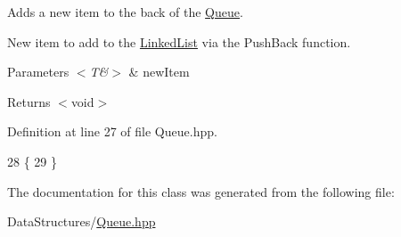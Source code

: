 Adds a new item to the back of the \hyperlink{classQueue}{Queue}. 

New item to add to the \hyperlink{classLinkedList}{Linked\+List} via the Push\+Back function.


\begin{DoxyParams}{Parameters}
{\em $<$\+T\&$>$} & new\+Item \\
\hline
\end{DoxyParams}
\begin{DoxyReturn}{Returns}
$<$void$>$ 
\end{DoxyReturn}


Definition at line 27 of file Queue.\+hpp.


\begin{DoxyCode}
28     \{
29     \}
\end{DoxyCode}


The documentation for this class was generated from the following file\+:\begin{DoxyCompactItemize}
\item 
Data\+Structures/\hyperlink{Queue_8hpp}{Queue.\+hpp}\end{DoxyCompactItemize}
